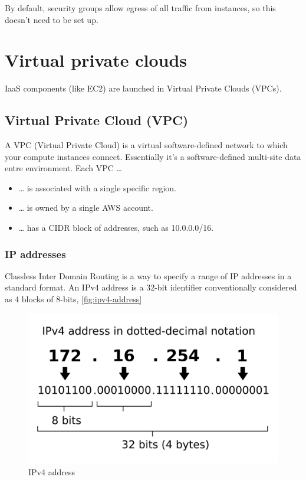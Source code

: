 \documentclass{pgnotes}
\begin{document}
By default, security groups allow egress of all traffic from instances, so this doesn't need to be set up.

\section{Virtual private clouds}
\label{sec:virtual-private-clouds}

IaaS components (like EC2) are launched in Virtual Private Clouds (VPCs).

\subsection{Virtual Private Cloud (VPC)}

A VPC (Virtual Private Cloud)  is a virtual software-defined network to which your compute instances connect.
Essentially it's a software-defined multi-site data entre environment.
Each VPC \ldots{}

\begin{itemize}
\item
  \ldots{} is associated with a single specific region.
\item
  \ldots{} is owned by a single AWS account.
\item
  \ldots{} has a CIDR block of addresses, such as 10.0.0.0/16.
\end{itemize}

\subsubsection{IP addresses}

Classless Inter Domain Routing is a way to specify a range of IP addresses in a standard format.
An IPv4 address is a 32-bit identifier conventionally considered as 4 blocks of 8-bits, \autoref{fig:ipv4-address}

\begin{figure}[htbp]
  \centering
  \includegraphics[width=0.5\linewidth]{ipv4_address}
  \caption{IPv4 address}
  \label{fig:ipv4-address}
\end{figure}
\end{document}
